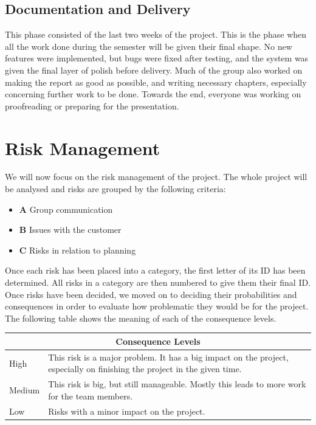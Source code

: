\subsection{Documentation and Delivery}
\label{subsec:PlanningProjPhasesDocDel}

This phase consisted of the last two weeks of the project. This is the phase when all the work done during the semester will be given their final shape. No new features were implemented, but bugs were fixed after testing, and the system was given the final layer of polish before delivery. Much of the group also worked on making the report as good as possible, and writing necessary chapters, especially concerning further work to be done. Towards the end, everyone was working on proofreading or preparing for the presentation.

\section{Risk Management}
\label{sec:PlanningRiskMan}
We will now focus on the risk management of the project. The whole project will be analysed and risks are grouped by the following criteria:
\begin{itemize}
\item \textbf{A} Group communication
\item \textbf{B} Issues with the customer
\item \textbf{C} Risks in relation to planning
\end{itemize}
Once each risk has been placed into a category, the first letter of its ID has been determined. All risks in a category are then numbered to give them their final ID. Once risks have been decided, we moved on to deciding their probabilities and consequences in order to evaluate how problematic they would be for the project. The following table shows the meaning of each of the consequence levels.

\begin{minipage}{\linewidth}
\setlength{\tabcolsep}{10pt}
\centering
{}
\begin{tabular}{ |l|p{5cm}| }
	\hline
	\multicolumn{2}{|c|}{\cellcolor{gray!25} Consequence Levels} \\
	\hline
	High & This risk is a major problem. It has a big impact on the project, especially on finishing the project in the given time.\\
	Medium & This risk is big, but still manageable. Mostly this leads to more work for the team members. \\
	Low & Risks with a minor impact on the project. \\
	\hline
\end{tabular}
\end{minipage}


